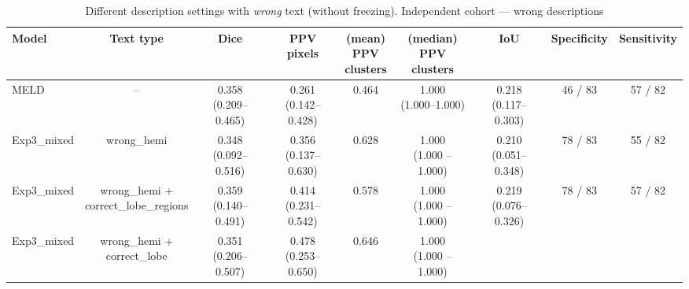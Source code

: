 \documentclass[a4paper,12pt]{article}
\begin{document}
\begin{table}[ht]
\centering
\tiny
\caption{Different description settings with \emph{wrong} text (without freezing). Independent cohort — wrong descriptions}
\label{tab:wrong_independent_cohort_mix_no_freeze}
\begin{tabular}{lcccccccc}
\textbf{Model} &
\textbf{Text type} &
\textbf{Dice} &
\makecell{\textbf{PPV}\\\textbf{pixels}} &
\makecell{\textbf{(mean)}\\\textbf{PPV}\\\textbf{clusters}} &
\makecell{\textbf{(median)}\\\textbf{PPV}\\\textbf{clusters}} &
\textbf{IoU} &
\textbf{Specificity} &
\textbf{Sensitivity} \\
\hline
MELD & -- &
\makecell{0.358\\(0.209--0.465)} &
\makecell{0.261\\(0.142--0.428)} &
0.464 &
\makecell{1.000\\(1.000--1.000)} &
\makecell{0.218\\(0.117--0.303)} &
46 / 83 & 
\colorbox{blue!20}{57 / 82} \\
\hline
Exp3\_mixed &
wrong\_hemi &
\makecell{0.348 \\ (0.092--0.516)} &
\makecell{0.356 \\ (0.137--0.630)} &
\colorbox{orange!20}{0.628} &
\makecell{1.000 \\ (1.000 -- 1.000)} &
\makecell{0.210 \\ (0.051--0.348)} &
78 / 83 &
55 / 82 \\
\hline
Exp3\_mixed &
\makecell{wrong\_hemi + \\ correct\_lobe\_regions} &
\makecell{\colorbox{orange!20}{0.359} \\ (0.140--0.491)} &
\makecell{0.414 \\ (0.231--0.542)} &
0.578 &
\makecell{1.000 \\ (1.000 -- 1.000)} &
\makecell{\colorbox{orange!20}{0.219} \\ (0.076--0.326)} &
78 / 83 &
\colorbox{blue!20}{57 / 82} \\
\hline
Exp3\_mixed &
\makecell{wrong\_hemi + \\ correct\_lobe} &
\makecell{0.351 \\ (0.206--0.507)} &
\makecell{\colorbox{green!20}{0.478} \\ (0.253--0.650)} &
\colorbox{green!20}{0.646} &
\makecell{1.000 \\ (1.000 -- 1.000)} &

\end{tabular}
\end{table}
\end{document}
